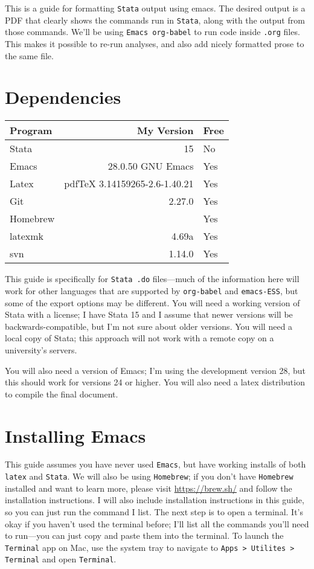 \documentclass[a4paper]{article}
\date{\today}
\title{}
\begin{document}
\tableofcontents

\begin{ABSTRACT}
This is a guide for formatting \texttt{Stata} output using emacs. The desired output is a PDF that clearly shows the commands run in \texttt{Stata}, along with the output from those commands. We'll be using \texttt{Emacs org-babel} to run code inside \texttt{.org} files. This makes it possible to re-run analyses, and also add nicely formatted prose to the same file. 
\end{ABSTRACT}

\section{Dependencies}
\label{sec:orgff04fd4}
\begin{center}
\begin{tabular}{lrl}
Program & My Version & Free\\
\hline
Stata & 15 & No\\
Emacs & 28.0.50 GNU Emacs & Yes\\
Latex & pdfTeX 3.14159265-2.6-1.40.21 & Yes\\
Git & 2.27.0 & Yes\\
Homebrew &  & Yes\\
latexmk & 4.69a & Yes\\
svn & 1.14.0 & Yes\\
\end{tabular}
\end{center}


This guide is specifically for \texttt{Stata .do} files---much of the information here will work for other languages that are supported by \texttt{org-babel} and \texttt{emacs-ESS}, but some of the export options may be different. You will need a working version of Stata with a license; I have Stata 15 and I assume that newer versions will be backwards-compatible, but I'm not sure about older versions. You will need a local copy of Stata; this approach will not work with a remote copy on a university's servers. 

You will also need a version of Emacs; I'm using the development version 28, but this should work for versions 24 or higher. You will also need a latex distribution to compile the final document. 

\section{Installing Emacs}
\label{sec:org3b61220}
This guide assumes you have never used \texttt{Emacs}, but have working installs of both \texttt{latex} and \texttt{Stata}. We will also be using \texttt{Homebrew}; if you don't have \texttt{Homebrew} installed and want to learn more, please visit \url{https://brew.sh/} and follow the installation instructions. I will also include installation instructions in this guide, so you can just run the command I list. The next step is to open a terminal. It's okay if you haven't used the terminal before; I'll list all the commands you'll need to run---you can just copy and paste them into the terminal. To launch the \texttt{Terminal} app on Mac, use the system tray to navigate to \texttt{Apps > Utilites > Terminal} and open \texttt{Terminal}.
\end{document}
